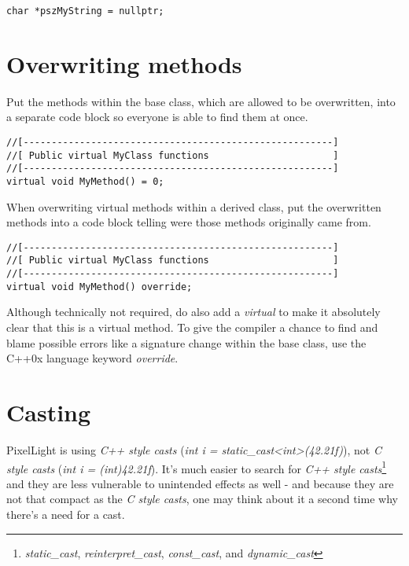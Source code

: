\begin{lstlisting}[caption=Null pointer]
char *pszMyString = nullptr;
\end{lstlisting}




\section{Overwriting methods}
Put the methods within the base class, which are allowed to be overwritten, into a separate code block so everyone is able to find them at once.
\begin{lstlisting}[caption=Virtual methods within a base class]
//[-------------------------------------------------------]
//[ Public virtual MyClass functions                      ]
//[-------------------------------------------------------]
virtual void MyMethod() = 0;
\end{lstlisting}

When overwriting virtual methods within a derived class, put the overwritten methods into a code block telling were those methods originally came from.
\begin{lstlisting}[caption=Overwriting virtual methods within a derived class]
//[-------------------------------------------------------]
//[ Public virtual MyClass functions                      ]
//[-------------------------------------------------------]
virtual void MyMethod() override;
\end{lstlisting}
Although technically not required, do also add a \emph{virtual} to make it absolutely clear that this is a virtual method. To give the compiler a chance to find and blame possible errors like a signature change within the base class, use the C++0x language keyword \emph{override}.




\section{Casting}
PixelLight is using \emph{C++ style casts} (\emph{int i = static\_cast<int>(42.21f)}), not \emph{C style casts} (\emph{int i = (int)42.21f}). It's much easier to search for \emph{C++ style casts}\footnote{\emph{static\_cast}, \emph{reinterpret\_cast}, \emph{const\_cast}, and \emph{dynamic\_cast}} and they are less vulnerable to unintended effects as well - and because they are not that compact as the \emph{C style casts}, one may think about it a second time why there's a need for a cast.

